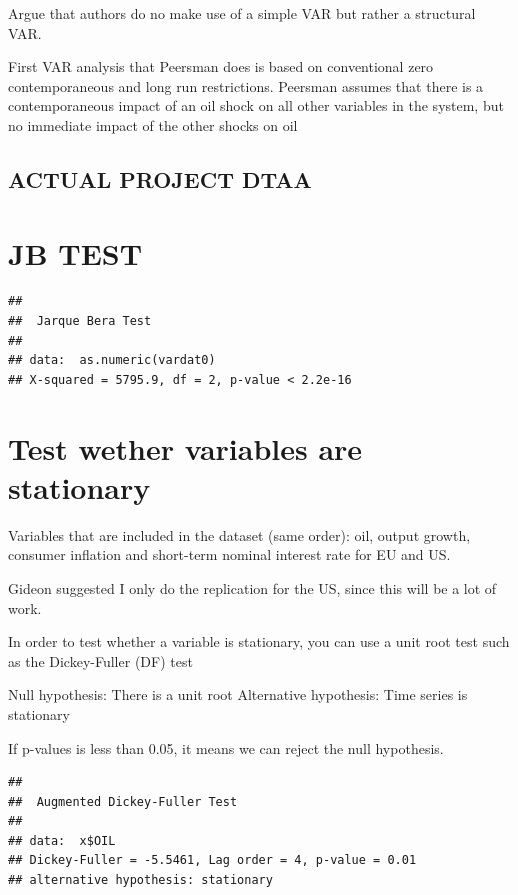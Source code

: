 \documentclass[11pt,preprint, authoryear]{elsarticle}
\numberwithin{equation}{section}
\numberwithin{figure}{section}
\numberwithin{table}{section}
\begin{document}
Argue that authors do no make use of a simple VAR but rather a
structural VAR.

First VAR analysis that Peersman does is based on conventional zero
contemporaneous and long run restrictions. Peersman assumes that there
is a contemporaneous impact of an oil shock on all other variables in
the system, but no immediate impact of the other shocks on oil

\hypertarget{actual-project-dtaa}{%
\subsection{ACTUAL PROJECT DTAA}\label{actual-project-dtaa}}

\hypertarget{jb-test}{%
\section{JB TEST}\label{jb-test}}

\begin{verbatim}
## 
##  Jarque Bera Test
## 
## data:  as.numeric(vardat0)
## X-squared = 5795.9, df = 2, p-value < 2.2e-16
\end{verbatim}

\hypertarget{test-wether-variables-are-stationary}{%
\section{\texorpdfstring{Test wether variables are stationary
\label{stationary}}{Test wether variables are stationary }}\label{test-wether-variables-are-stationary}}

Variables that are included in the dataset (same order): oil, output
growth, consumer inflation and short-term nominal interest rate for EU
and US.

Gideon suggested I only do the replication for the US, since this will
be a lot of work.

In order to test whether a variable is stationary, you can use a unit
root test such as the Dickey-Fuller (DF) test

Null hypothesis: There is a unit root Alternative hypothesis: Time
series is stationary

If p-values is less than 0.05, it means we can reject the null
hypothesis.

\begin{verbatim}
## 
##  Augmented Dickey-Fuller Test
## 
## data:  x$OIL
## Dickey-Fuller = -5.5461, Lag order = 4, p-value = 0.01
## alternative hypothesis: stationary
\end{verbatim}
\end{document}
